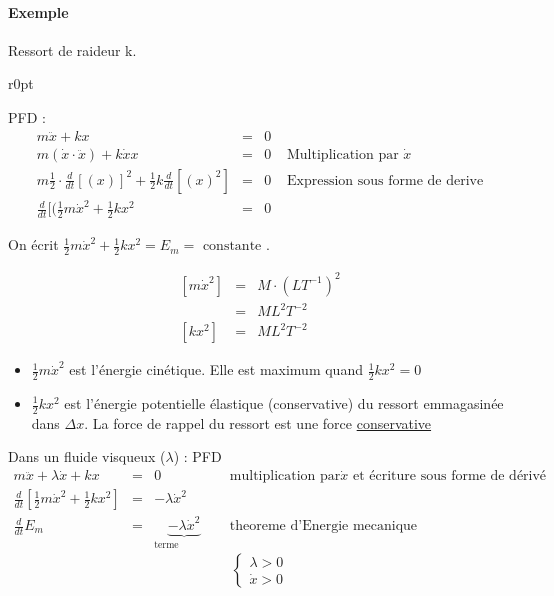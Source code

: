 \paragraph{Exemple}

Ressort de raideur k.

\begin{wrapfigure}[7]{r}{0pt}
\end{wrapfigure}

PFD : \[
	\begin{array}{rclr}
		m\ddot{x} + kx &=& 0\\
		m(\dot{x}\cdot \ddot{x}) + k\dot{x}x &=& 0  & \text{ Multiplication par } \dot{x} \\
		m \frac{1}{2} \cdot \frac{d}{dt}[(x)]^2 + \frac{1}{2}k\frac{d}{dt}[(x)^2] &=& 0 & \text{ Expression sous forme de derive}\\
		\frac{d}{dt}[(\frac{1}{2}m\dot{x}^2 + \frac{1}{2}kx^2 &=& 0
\end{array}\]

On écrit $\frac{1}{2}m\dot{x}^2 + \frac{1}{2}kx^2 = E_m = \text{ constante }$.

\[
	\begin{array}{rcl}
		{[m\dot{x}^2]} &=& M\cdot(LT^{-1})^2 \\
							  &=& ML^2T^{-2} \\
		{[kx^2]} &=& ML^2T^{-2}
	\end{array}
\]

\begin{itemize}
	\item $\frac{1}{2}m\dot{x}^2$ est l'énergie cinétique. Elle est maximum quand $\frac{1}{2}kx^2 = 0$
	\item $\frac{1}{2}kx^2$ est l'énergie potentielle élastique (conservative) du ressort emmagasinée dans $\Delta x$. La force de rappel du ressort est une force \ul{conservative}
\end{itemize}

Dans un fluide visqueux ($\lambda$) : PFD\[
	\begin{array}{rclr}
		m\ddot{x} + \lambda \dot{x} + kx &=& 0 & \text{ multiplication par} \dot{x} \text{ et écriture sous forme de dérivé} \\
		\frac{d}{dt}[\frac{1}{2}m\dot{x}^2 + \frac{1}{2}kx^2] &=& -\lambda \dot{x}^2 \\
		\frac{d}{dt}E_m &=& \underbrace{-\lambda\dot{x}^2}_{\text{terme dissipatif}} & \text{ theoreme d'Energie mecanique }
	\end{array}
\]
\[
	\left\{
		\begin{array}{c}
			\lambda > 0 \\
			\dot{x} > 0
	\end{array}\right.\]

